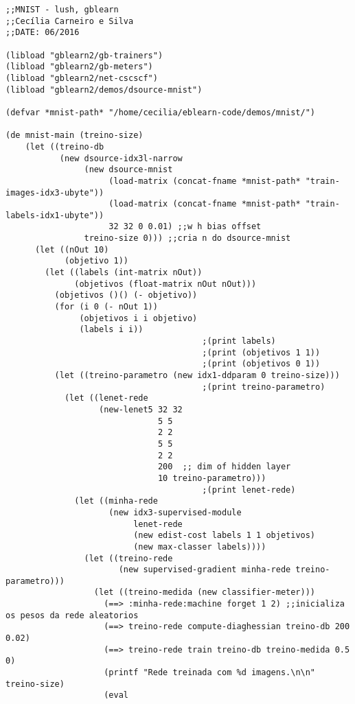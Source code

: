 \documentclass[11pt]{article}
\begin{document}
\begin{verbatim}
;;MNIST - lush, gblearn
;;Cecília Carneiro e Silva
;;DATE: 06/2016

(libload "gblearn2/gb-trainers")
(libload "gblearn2/gb-meters")
(libload "gblearn2/net-cscscf")
(libload "gblearn2/demos/dsource-mnist")

(defvar *mnist-path* "/home/cecilia/eblearn-code/demos/mnist/")

(de mnist-main (treino-size)
    (let ((treino-db
           (new dsource-idx3l-narrow
                (new dsource-mnist 
                     (load-matrix (concat-fname *mnist-path* "train-images-idx3-ubyte"))
                     (load-matrix (concat-fname *mnist-path* "train-labels-idx1-ubyte"))
                     32 32 0 0.01) ;;w h bias offset
                treino-size 0))) ;;cria n do dsource-mnist
      (let ((nOut 10)
            (objetivo 1))
        (let ((labels (int-matrix nOut))
              (objetivos (float-matrix nOut nOut)))
          (objetivos ()() (- objetivo))
          (for (i 0 (- nOut 1))
               (objetivos i i objetivo)
               (labels i i))
                                        ;(print labels)
                                        ;(print (objetivos 1 1))
                                        ;(print (objetivos 0 1))
          (let ((treino-parametro (new idx1-ddparam 0 treino-size)))
                                        ;(print treino-parametro)
            (let ((lenet-rede
                   (new-lenet5 32 32
                               5 5
                               2 2
                               5 5
                               2 2
                               200  ;; dim of hidden layer
                               10 treino-parametro)))
                                        ;(print lenet-rede)
              (let ((minha-rede
                     (new idx3-supervised-module
                          lenet-rede
                          (new edist-cost labels 1 1 objetivos)
                          (new max-classer labels))))
                (let ((treino-rede
                       (new supervised-gradient minha-rede treino-parametro)))
                  (let ((treino-medida (new classifier-meter)))
                    (==> :minha-rede:machine forget 1 2) ;;inicializa os pesos da rede aleatorios
                    (==> treino-rede compute-diaghessian treino-db 200 0.02)
                    (==> treino-rede train treino-db treino-medida 0.5 0)
                    (printf "Rede treinada com %d imagens.\n\n" treino-size)
                    (eval

\end{verbatim}
\end{document}
